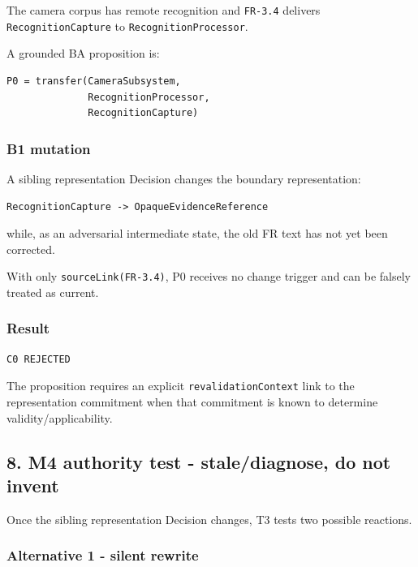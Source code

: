 \documentclass[11pt,a4paper]{article}
\begin{document}
The camera corpus has remote recognition and \texttt{FR-3.4} delivers
\texttt{RecognitionCapture} to \texttt{RecognitionProcessor}.

A grounded BA proposition is:

\begin{verbatim}
P0 = transfer(CameraSubsystem,
              RecognitionProcessor,
              RecognitionCapture)
\end{verbatim}

\subsubsection{B1 mutation}\label{b1-mutation}

A sibling representation Decision changes the boundary representation:

\begin{verbatim}
RecognitionCapture -> OpaqueEvidenceReference
\end{verbatim}

while, as an adversarial intermediate state, the old FR text has not yet
been corrected.

With only \texttt{sourceLink(FR-3.4)}, P0 receives no change trigger and
can be falsely treated as current.

\subsubsection{Result}\label{result-3}

\begin{verbatim}
C0 REJECTED
\end{verbatim}

The proposition requires an explicit \texttt{revalidationContext} link
to the representation commitment when that commitment is known to
determine validity/applicability.

\subsection{8. M4 authority test - stale/diagnose, do not
invent}\label{m4-authority-test---stalediagnose-do-not-invent}

Once the sibling representation Decision changes, T3 tests two possible
reactions.

\subsubsection{Alternative 1 - silent
rewrite}\label{alternative-1---silent-rewrite}
\end{document}

